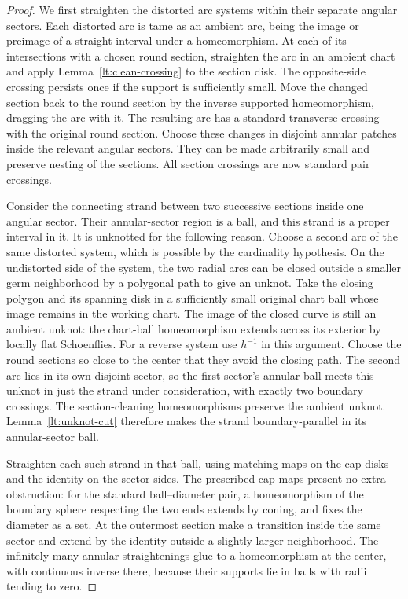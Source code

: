\documentclass[11pt]{article}
\numberwithin{equation}{section}
\theoremstyle{definition}
\theoremstyle{remark}
\begin{document}
\begin{proof}
We first straighten the distorted arc systems within their separate
angular sectors.  Each distorted arc is tame as an ambient arc, being
the image or preimage of a straight interval under a homeomorphism.
At each of its intersections with a chosen round section, straighten
the arc in an ambient chart and apply Lemma~\ref{lt:clean-crossing} to
the section disk.  The opposite-side crossing persists once if the
support is sufficiently small.  Move the changed section back to the
round section by the inverse supported homeomorphism, dragging the
arc with it.  The resulting arc has a standard transverse crossing
with the original round section.  Choose these changes in disjoint
annular patches inside the relevant angular sectors.  They can be
made arbitrarily small and preserve nesting of the sections.  All
section crossings are now standard pair crossings.

Consider the connecting strand between two successive sections inside
one angular sector.  Their annular-sector region is a ball, and this
strand is a proper interval in it.  It is unknotted for the following
reason.  Choose a second arc of the same distorted system, which is
possible by the cardinality hypothesis.  On the undistorted side of
the system, the two radial arcs can be closed outside a smaller germ
neighborhood by a polygonal path to give an unknot.  Take the closing
polygon and its spanning disk in a sufficiently small original chart
ball whose image remains in the working chart.  The image of the
closed curve is still an ambient unknot: the chart-ball homeomorphism
extends across its exterior by locally flat Schoenflies.  For a
reverse system use $h^{-1}$ in this argument.  Choose the round
sections so close to the center that they avoid the closing path.
The second arc lies in its own disjoint sector, so the first sector's
annular ball meets this unknot in just the strand under consideration,
with exactly two boundary crossings.  The section-cleaning
homeomorphisms preserve the ambient unknot.  Lemma~\ref{lt:unknot-cut}
therefore makes the strand boundary-parallel in its annular-sector
ball.

Straighten each such strand in that ball, using matching maps on the
cap disks and the identity on the sector sides.  The prescribed cap
maps present no extra obstruction: for the standard ball--diameter
pair, a homeomorphism of the boundary sphere respecting the two ends
extends by coning, and fixes the diameter as a set.  At the outermost
section make a transition inside the same sector and extend by the
identity outside a slightly larger neighborhood.  The infinitely
many annular straightenings glue to a homeomorphism at the center,
with continuous inverse there, because their supports lie in balls
with radii tending to zero.


\end{proof}
\end{document}
